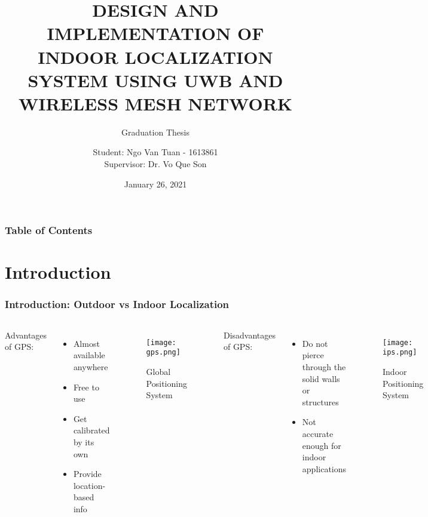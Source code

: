 \documentclass[10pt]{beamer}
\title[INDOOR LOCALIZATION SYSTEM]{DESIGN AND IMPLEMENTATION OF INDOOR LOCALIZATION SYSTEM USING UWB AND WIRELESS MESH NETWORK}
\subtitle{Graduation Thesis}
\author[Ngo Van Tuan - 1613861]{Student: Ngo Van Tuan - 1613861\\
Supervisor: Dr. Vo Que Son
}
\institute[HCMUT] %
{
  \inst{1}
  FACULTY OF ELECTRICAL AND ELECTRONICS  ENGINEERING\\
  DEPARTMENT OF TELECOMMUNICATIONS ENGINEERING
}
\date{January 26, 2021}
\begin{document}
\frame{\titlepage}

\begin{frame}
    \frametitle{Table of Contents}
    \tableofcontents
\end{frame}


\section{Introduction}


\begin{frame}
\frametitle{Introduction: Outdoor vs Indoor Localization}
\begin{columns}
Advantages of GPS:
\begin{itemize}
    \item Almost available anywhere
    \item Free to use
    \item Get calibrated by its own
    \item Provide location-based info
\end{itemize}
\begin{figure}[h]
    \begin{center}
        \texttt{[image: gps.png]}
    \end{center}
    \caption{Global Positioning System}
    \label{fig:gps}
\end{figure}
Disadvantages of GPS:
\begin{itemize}
    \item Do not pierce through the solid walls or structures
    \item Not accurate enough for indoor applications
\end{itemize}
\begin{figure}[h]
    \begin{center}
        \texttt{[image: ips.png]}
    \end{center}
    \caption{Indoor Positioning System}
    \label{fig:ips}
\end{figure}
\end{columns}
\end{frame}
\end{document}
